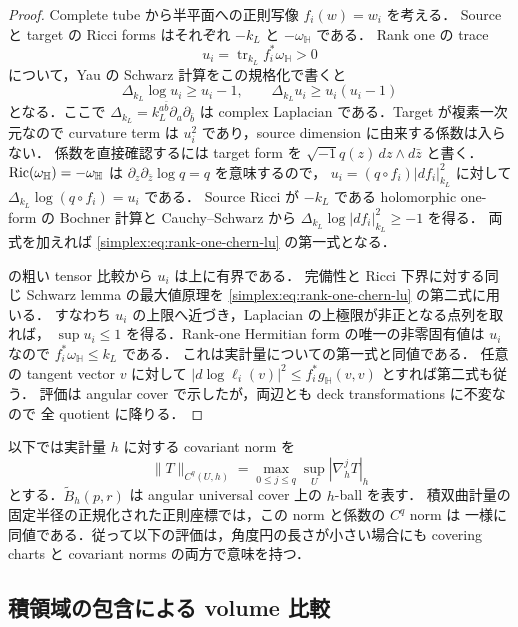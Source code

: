 \begin{proof}
Complete tube から半平面への正則写像 $f_i(w)=w_i$ を考える．
Source と target の Ricci forms はそれぞれ $-k_L$ と $-\omega_{\mathbb H}$ である．
Rank one の trace
\[
 u_i=\operatorname{tr}_{k_L}f_i^*\omega_{\mathbb H}>0
\]
について，Yau\cite[Theorem~2 and its proof]{YauSchwarzThm2} の
Schwarz 計算をこの規格化で書くと
\begin{equation}\label{simplex:eq:rank-one-chern-lu}
 \Delta_{k_L}\log u_i\ge u_i-1,
 \qquad
 \Delta_{k_L}u_i\ge u_i(u_i-1)
\end{equation}
となる．ここで $\Delta_{k_L}=k_L^{a\bar b}\partial_a\partial_{\bar b}$ は
complex Laplacian である．Target が複素一次元なので curvature term は
$u_i^2$ であり，source dimension に由来する係数は入らない．
係数を直接確認するには target form を
$\sqrt{-1}q(z)\,dz\wedge d\bar z$ と書く．
$\operatorname{Ric}(\omega_{\mathbb H})=-\omega_{\mathbb H}$ は
$\partial_z\partial_{\bar z}\log q=q$ を意味するので，
$u_i=(q\circ f_i)|df_i|_{k_L}^2$ に対して
$\Delta_{k_L}\log(q\circ f_i)=u_i$ である．
Source Ricci が $-k_L$ である holomorphic one-form の Bochner 計算と
Cauchy--Schwarz から
$\Delta_{k_L}\log|df_i|_{k_L}^2\ge-1$ を得る．
両式を加えれば \eqref{simplex:eq:rank-one-chern-lu} の第一式となる．

 の粗い tensor 比較から $u_i$ は上に有界である．
完備性と Ricci 下界に対する同じ Schwarz lemma の最大値原理を
\eqref{simplex:eq:rank-one-chern-lu} の第二式に用いる．
すなわち $u_i$ の上限へ近づき，Laplacian の上極限が非正となる点列を取れば，
$\sup u_i\le1$ を得る．Rank-one Hermitian form の唯一の非零固有値は
$u_i$ なので $f_i^*\omega_{\mathbb H}\le k_L$ である．
これは実計量についての第一式と同値である．
任意の tangent vector $v$ に対して
$|d\log\ell_i(v)|^2\le f_i^*g_{\mathbb H}(v,v)$ とすれば第二式も従う．
評価は angular cover で示したが，両辺とも deck transformations に不変なので
全 quotient に降りる．
\end{proof}

以下では実計量 $h$ に対する covariant norm を
\[
 \|T\|_{C^q(U,h)}
   =\max_{0\le j\le q}\sup_U|\nabla_h^jT|_h
\]
とする．$\widetilde B_h(p,r)$ は angular universal cover 上の $h$-ball を表す．
積双曲計量の固定半径の正規化された正則座標では，この norm と係数の $C^q$ norm は
一様に同値である．従って以下の評価は，角度円の長さが小さい場合にも
covering charts と covariant norms の両方で意味を持つ．

\subsection{積領域の包含による volume 比較}

